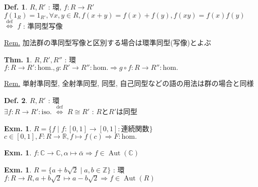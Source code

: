 \documentclass[uplatex,dvipdfmx,9pt]{beamer}
\newcommand{\defarrow}{\overset{\mathrm{def}}{\Leftrightarrow}}
\newcommand{\Aut}{\operatorname{Aut}}
\newcounter{textExmCount}
\theoremstyle{definition} %
\newtheorem{defn}{Def.}[subsection] %
\newtheorem{thm}{Thm.}[subsection] %
\theoremstyle{example}
\newtheorem{exmText}[textExmCount]{Exm.}
\begin{document}
    \begin{frame}

      \begin{defn}
        $R, R'$ : 環, $f\colon R \to R'$ \\
        $f(1_R) = 1_{R'}, \forall x, y \in R, f(x + y) = f(x) + f(y), f(xy) = f(x)f(y)$ $\defarrow$ $f$ : \alert{準同型写像}
      \end{defn}
      \underline{Rem.} 加法群の準同型写像と区別する場合は\alert{環準同型(写像)}とよぶ

      \begin{thm}
        $R, R', R''$ : 環 \\
        $f\colon R \to R' : \text{hom.}, g\colon R' \to R'' : \text{hom.} \Rightarrow g \circ f \colon R \to R'' : \text{hom.}$
      \end{thm}
      \underline{Rem.} \alert{単射準同型}, \alert{全射準同型}, \alert{同型}, \alert{自己同型}などの語の用法は群の場合と同様

      \begin{defn}
        $R, R'$ : 環 \\
        $\exists f\colon R \to R' : \text{iso.}$ $\defarrow$ $R \cong R'$ : $R$と$R'$は\alert{同型}
      \end{defn}
      
    \end{frame}

    \begin{frame}

      \begin{exmText}
        $R = \{f \mid f\colon [0, 1] \to [0, 1] : \text{連続関数}\}$ \\
        $c \in [0, 1], F\colon R \to \mathbb{R}, f \mapsto f(c) \Rightarrow F : \text{hom.}$
      \end{exmText}

      \begin{exmText}
        $f\colon \mathbb{C} \to \mathbb{C}, \alpha \mapsto \bar{\alpha} \Rightarrow f \in \Aut(\mathbb{C})$
      \end{exmText}

      \begin{exmText}
        $R = \{a + b\sqrt{2} \mid a, b \in \mathbb{Z}\}$ : 環 \\
        $f\colon R \to R, a + b\sqrt{2} \mapsto a - b\sqrt{2} \Rightarrow f \in \Aut(R)$
      \end{exmText}
      
    \end{frame}
\end{document}
